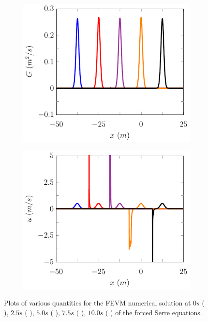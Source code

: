 \begin{figure}
\begin{subfigure}{0.5\textwidth}
		\vspace{0.5cm}
	\end{subfigure}
	\begin{subfigure}{0.5\textwidth}
		\includegraphics[width=\textwidth]{./chp5/figures/Forced/Dry/P2P/FEVMExG.pdf}
		\vspace{0.5cm}
	\end{subfigure}%
	\begin{subfigure}{0.5\textwidth}
		\includegraphics[width=\textwidth]{./chp5/figures/Forced/Dry/P2P/FEVMExu.pdf}
		\vspace{0.5cm}
	\end{subfigure}
	\caption{Plots of various quantities for the FEVM numerical solution at $0s$ ({\color{blue} \solidrule}), $2.5s$ ({\color{red} \solidrule}), $5.0s$ ({\color{violet!80!white} \solidrule}), $7.5s$ ({\color{orange} \solidrule}), $10.0s$ ({\color{black} \solidrule}) of the forced Serre equations.}
	\label{fig:ForcedFEVMP2PExAll}
\end{figure}


